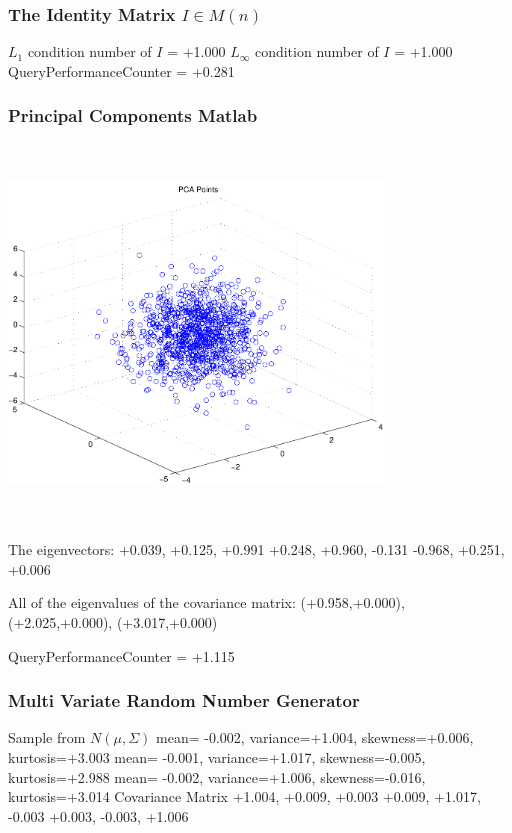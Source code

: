 \documentclass[9pt]{article}
\theoremstyle{plain}
\theoremstyle{definition}
\theoremstyle{remark}
\numberwithin{equation}{section}
\begin{document}
\subsubsection{The Identity Matrix $I \in M(n)$}
$L_1$ condition number of $I$ = +1.000
$L_\infty$ condition number of $I$ = +1.000
QueryPerformanceCounter  =  +0.281
\subsubsection{Principal Components Matlab }
\includegraphics[width=10.0cm,height=10.0cm]{PCAPoints.pdf}

The eigenvectors:
+0.039, +0.125, +0.991
+0.248, +0.960, -0.131
-0.968, +0.251, +0.006

All of the eigenvalues of the covariance matrix:
(+0.958,+0.000), (+2.025,+0.000), (+3.017,+0.000)

QueryPerformanceCounter  =  +1.115
\subsubsection{Multi Variate Random Number Generator }
Sample from $N(\mu,\Sigma)$
mean= -0.002, variance=+1.004, skewness=+0.006, kurtosis=+3.003
mean= -0.001, variance=+1.017, skewness=-0.005, kurtosis=+2.988
mean= -0.002, variance=+1.006, skewness=-0.016, kurtosis=+3.014
Covariance Matrix 
+1.004, +0.009, +0.003
+0.009, +1.017, -0.003
+0.003, -0.003, +1.006
\end{document}
